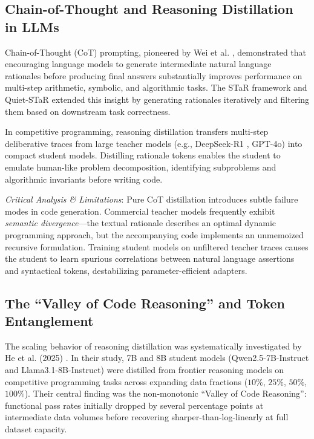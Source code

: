 \documentclass{ieeeaccess}
\begin{document}
\subsection{Chain-of-Thought and Reasoning Distillation in LLMs}
Chain-of-Thought (CoT) prompting, pioneered by Wei et al. \cite{wei2022chainofthought}, demonstrated that encouraging language models to generate intermediate natural language rationales before producing final answers substantially improves performance on multi-step arithmetic, symbolic, and algorithmic tasks. The STaR framework \cite{zelikman2022star} and Quiet-STaR \cite{zelikman2024quietstar} extended this insight by generating rationales iteratively and filtering them based on downstream task correctness.

In competitive programming, reasoning distillation transfers multi-step deliberative traces from large teacher models (e.g., DeepSeek-R1 \cite{guo2025deepseekr1}, GPT-4o) into compact student models. Distilling rationale tokens enables the student to emulate human-like problem decomposition, identifying subproblems and algorithmic invariants before writing code.

\textit{Critical Analysis \& Limitations}: Pure CoT distillation introduces subtle failure modes in code generation. Commercial teacher models frequently exhibit \textit{semantic divergence}---the textual rationale describes an optimal dynamic programming approach, but the accompanying code implements an unmemoized recursive formulation. Training student models on unfiltered teacher traces causes the student to learn spurious correlations between natural language assertions and syntactical tokens, destabilizing parameter-efficient adapters.

\subsection{The ``Valley of Code Reasoning'' and Token Entanglement}
The scaling behavior of reasoning distillation was systematically investigated by He et al. (2025) \cite{he2025valley}. In their study, 7B and 8B student models (Qwen2.5-7B-Instruct and Llama3.1-8B-Instruct) were distilled from frontier reasoning models on competitive programming tasks across expanding data fractions ($10\%$, $25\%$, $50\%$, $100\%$). Their central finding was the non-monotonic ``Valley of Code Reasoning'': functional pass rates initially dropped by several percentage points at intermediate data volumes before recovering sharper-than-log-linearly at full dataset capacity.
\end{document}
